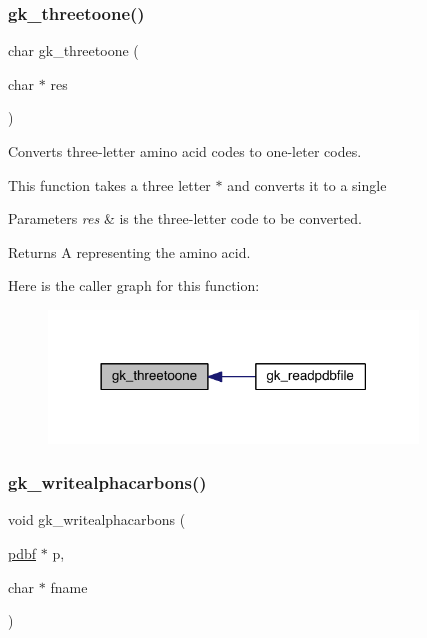 \subsubsection{\texorpdfstring{gk\+\_\+threetoone()}{gk\_threetoone()}}
{\footnotesize\ttfamily char gk\+\_\+threetoone (\begin{DoxyParamCaption}\item[{char $\ast$}]{res }\end{DoxyParamCaption})}



Converts three-\/letter amino acid codes to one-\/leter codes. 

This function takes a three letter {\ttfamily $\ast$} and converts it to a single {\ttfamily } 


\begin{DoxyParams}{Parameters}
{\em res} & is the three-\/letter code to be converted. \\
\hline
\end{DoxyParams}
\begin{DoxyReturn}{Returns}
A {\ttfamily representing} the amino acid. 
\end{DoxyReturn}
Here is the caller graph for this function\+:\nopagebreak
\begin{figure}[H]
\begin{center}
\leavevmode
\includegraphics[width=278pt]{a00125_a6eb7d344c153ba6c0bbe608c18a4a2a1_icgraph}
\end{center}
\end{figure}
\mbox{\label{a00125_ad0eef52d1d7e2da669accced22e821a4}} 
\subsubsection{\texorpdfstring{gk\+\_\+writealphacarbons()}{gk\_writealphacarbons()}}
{\footnotesize\ttfamily void gk\+\_\+writealphacarbons (\begin{DoxyParamCaption}\item[{\hyperlink{a00666}{pdbf} $\ast$}]{p,  }\item[{char $\ast$}]{fname }\end{DoxyParamCaption})}



